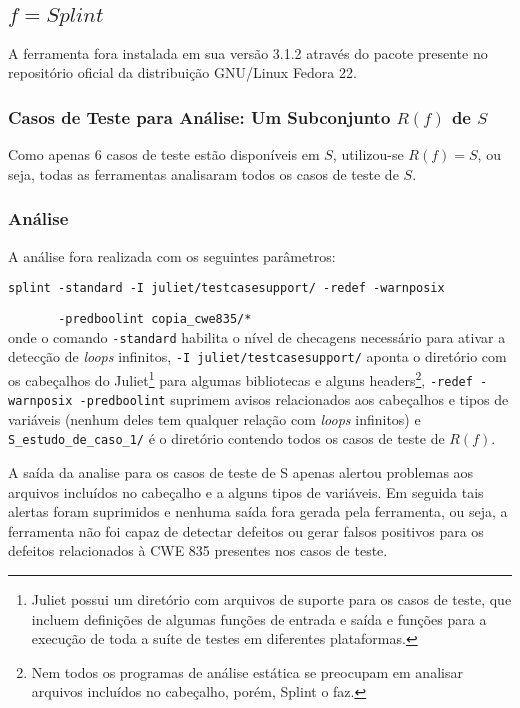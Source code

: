 \subsection{$f = Splint$}

A ferramenta fora instalada em sua versão 3.1.2 através do pacote presente no repositório oficial da distribuição GNU/Linux Fedora 22.

\subsubsection{Casos de Teste para Análise: Um Subconjunto $R(f)$ de $S$}

Como apenas 6 casos de teste estão disponíveis em $S$, utilizou-se $R(f) = S$, ou seja, todas as ferramentas analisaram todos os casos de teste de $S$.

\subsubsection{Análise}

A análise fora realizada com os seguintes parâmetros:

\lstinline{splint -standard -I juliet/testcasesupport/ -redef -warnposix}

\lstinline{       -predboolint copia_cwe835/*}\\
onde o comando \lstinline{-standard} habilita o nível de checagens necessário para ativar a detecção de \textit{loops} infinitos, \lstinline{-I juliet/testcasesupport/} aponta o diretório com os cabeçalhos do Juliet\footnote{Juliet possui um diretório com arquivos de suporte para os casos de teste, que incluem definições de algumas funções de entrada e saída e funções para a execução de toda a suíte de testes em diferentes plataformas.} para algumas bibliotecas e alguns headers\footnote{Nem todos os programas de análise estática se preocupam em analisar arquivos incluídos no cabeçalho, porém, Splint o faz.}, \lstinline{-redef -warnposix -predboolint} suprimem avisos relacionados aos cabeçalhos e tipos de variáveis (nenhum deles tem qualquer relação com \textit{loops} infinitos) e \lstinline{S_estudo_de_caso_1/} é o diretório contendo todos os casos de teste de $R(f)$.

A saída da analise para os casos de teste de S apenas alertou problemas aos arquivos incluídos no cabeçalho e a alguns tipos de variáveis. Em seguida tais alertas foram suprimidos e nenhuma saída fora gerada pela ferramenta, ou seja, a ferramenta não foi capaz de detectar defeitos ou gerar falsos positivos para os defeitos relacionados à CWE 835 presentes nos casos de teste.

